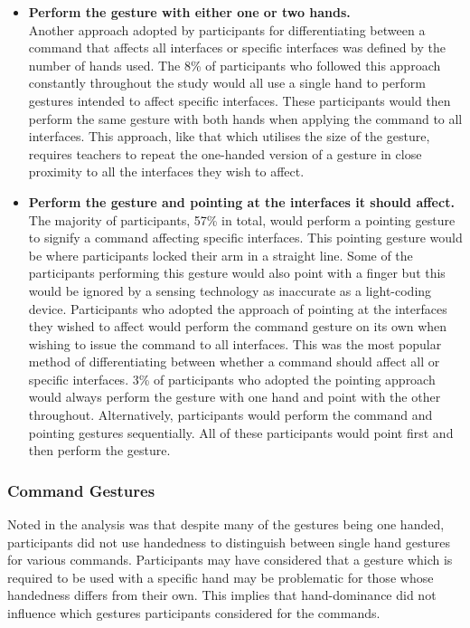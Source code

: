 \documentclass[link]{IWCOMP}
\begin{document}
\begin{itemize}
\item \textbf{Perform the gesture with either one or two hands.}\\
Another approach adopted by participants for differentiating between a command that affects all interfaces or specific interfaces was defined by the number of hands used. 
The 8\% of participants who followed this approach constantly throughout the study would all use a single hand to perform gestures intended to affect specific interfaces.
These participants would then perform the same gesture with both hands when applying the command to all interfaces.
This approach, like that which utilises the size of the gesture, requires teachers to repeat the one-handed version of a gesture in close proximity to all the interfaces they wish to affect.

\item \textbf{Perform the gesture and pointing at the interfaces it should affect.}\\
The majority of participants, 57\% in total, would perform a pointing gesture to signify a command affecting specific interfaces.
This pointing gesture would be where participants locked their arm in a straight line.
Some of the participants performing this gesture would also point with a finger but this would be ignored by a sensing technology as inaccurate as a light-coding device.
Participants who adopted the approach of pointing at the interfaces they wished to affect would perform the command gesture on its own when wishing to issue the command to all interfaces.
This was the most popular method of differentiating between whether a command should affect all or specific interfaces.
3\% of participants who adopted the pointing approach would always perform the gesture with one hand and point with the other throughout.
Alternatively, participants would perform the command and pointing gestures sequentially.
All of these participants would point first and then perform the gesture.

\end{itemize}

\subsubsection{Command Gestures}
\label{subsubsec:focusGroupResultsCommandGestures}

Noted in the analysis was that despite many of the gestures being one handed, participants did not use handedness to distinguish between single hand gestures for various commands.
Participants may have considered that a gesture which is required to be used with a specific hand may be problematic for those whose handedness differs from their own.
This implies that hand-dominance did not influence which gestures participants considered for the commands.
\end{document}
